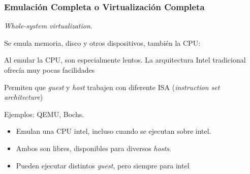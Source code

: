 \documentclass[ucs]{beamer}
\begin{document}
\begin{frame}[fragile]

\frametitle{Emulación Completa o Virtualización Completa}
\emph{Whole-system virtualization}.
\begin{footnotesize}
\end{footnotesize}
Se emula memoria, disco y otros dispositivos, también la CPU:

Al emular la CPU, son especialmente lentos. La arquitectura Intel 
tradicional ofrecía muy pocas facilidades

Permiten que \emph{guest} y \emph{host} trabajen con diferente
ISA (\emph{instruction set architecture})

\end{frame}


\begin{frame}[fragile]

Ejemplos: QEMU, Bochs. 
\begin{itemize}
\item
Emulan una CPU intel, incluso cuando se ejecutan
sobre intel. 
\item
Ambos son libres, disponibles para diversos \emph{hosts}.
\item
Pueden ejecutar distintos
\emph{guest}, pero siempre para intel
\end{itemize}



\end{frame}
\end{document}
